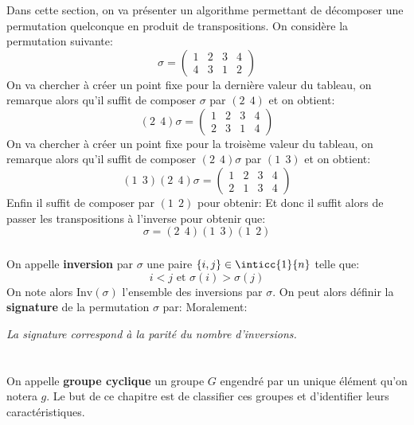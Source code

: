 \subsection*{}
Dans cette section, on va présenter un algorithme permettant de décomposer une permutation quelconque en produit de transpositions.\+
On considère la permutation suivante:
\[
   \sigma = \begin{pmatrix}
      1 & 2 & 3 & 4\\
      4 & 3 & 1 & 2
   \end{pmatrix}  
\]
On va chercher à créer un point fixe pour la dernière valeur du tableau, on remarque alors qu'il suffit de composer \(\sigma\) par \((2 \;\, 4)\) et on obtient:
\[
   (2 \;\, 4)\sigma = \begin{pmatrix}
      1 & 2 & 3 & 4\\
      2 & 3 & 1 & 4
   \end{pmatrix}  
\]
On va chercher à créer un point fixe pour la troisème valeur du tableau, on remarque alors qu'il suffit de composer \((2 \;\, 4)\sigma\) par \((1 \;\, 3)\) et on obtient:
\[
   (1 \;\, 3)(2 \;\, 4)\sigma = \begin{pmatrix}
      1 & 2 & 3 & 4\\
      2 & 1 & 3 & 4
   \end{pmatrix}  
\]
Enfin il suffit de composer par \((1 \;\, 2)\) pour obtenir:
Et donc il suffit alors de passer les transpositions à l'inverse pour obtenir que:
\[
   \sigma = (2 \;\, 4)(1 \;\, 3)(1 \;\, 2)
\]
\subsection*{}
On appelle \textbf{inversion} par \(\sigma\) une paire \(\{i, j\} \in \inticc{1}{n}\) telle que:
\[
   i < j \text{ et } \sigma(i) > \sigma(j)  
\] 
On note alors \(\text{Inv}(\sigma)\) l'ensemble des inversions par \(\sigma\). On peut alors définir la \textbf{signature} de la permutation \(\sigma\) par:
Moralement:
\begin{center}
   \textit{La signature correspond à la parité du nombre d'inversions.}
\end{center}

\chapter*{}
On appelle \textbf{groupe cyclique} un groupe \(G\) engendré par un unique élément qu'on notera \(g\). Le but de ce chapitre est de classifier ces groupes et d'identifier leurs caractéristiques.\<

